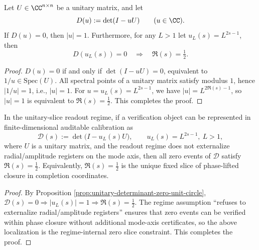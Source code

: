 \begin{proposition}[Zero Localization of Unitary Determinant: \texorpdfstring{$|u|=1$}{|u|=1}]\label{prop:unitary-determinant-zero-unit-circle}
Let \(U\in\CC^{n\times n}\) be a unitary matrix, and let
\[
D(u):=\det(I-uU)\qquad(u\in\CC).
\]
If \(D(u)=0\), then \(|u|=1\).
Furthermore, for any \(L>1\) let \(u_L(s)=L^{2s-1}\), then
\[
D(u_L(s))=0\quad\Longrightarrow\quad \Re(s)=\tfrac12.
\]
\end{proposition}
\begin{proof}
\(D(u)=0\) if and only if \(\det(I-uU)=0\), equivalent to \(1/u\in\mathrm{Spec}(U)\).
All spectral points of a unitary matrix satisfy modulus \(1\), hence \(|1/u|=1\), i.e., \(|u|=1\).
For \(u=u_L(s)=L^{2s-1}\), we have \(|u|=L^{2\Re(s)-1}\), so \(|u|=1\) is equivalent to \(\Re(s)=\tfrac12\).
This completes the proof.
\end{proof}

\begin{theorem}\label{thm:phase-lift-fixed-slice}
In the unitary-slice readout regime, if a verification object can be represented in finite-dimensional auditable calibration as
\[
\mathcal{D}(s):=\det\!\bigl(I-u_L(s)U\bigr),
\qquad
u_L(s)=L^{2s-1},\ L>1,
\]
where \(U\) is a unitary matrix, and the readout regime does not externalize radial/amplitude registers on the mode axis,
then all zero events of \(\mathcal{D}\) satisfy \(\Re(s)=\tfrac12\).
Equivalently, \(\Re(s)=\tfrac12\) is the unique fixed slice of phase-lifted closure in completion coordinates.
\end{theorem}
\begin{proof}
By Proposition \ref{prop:unitary-determinant-zero-unit-circle}, \(\mathcal{D}(s)=0\Rightarrow |u_L(s)|=1\Rightarrow \Re(s)=\tfrac12\).
The regime assumption ``refuses to externalize radial/amplitude registers'' ensures that zero events can be verified within phase closure without additional mode-axis certificates, so the above localization is the regime-internal zero slice constraint. This completes the proof.
\end{proof}

